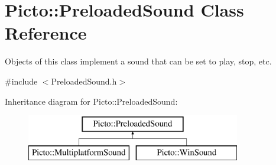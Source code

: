 \hypertarget{class_picto_1_1_preloaded_sound}{\section{Picto\-:\-:Preloaded\-Sound Class Reference}
\label{class_picto_1_1_preloaded_sound}
}


Objects of this class implement a sound that can be set to play, stop, etc.  




{\ttfamily \#include $<$Preloaded\-Sound.\-h$>$}

Inheritance diagram for Picto\-:\-:Preloaded\-Sound\-:\begin{figure}[H]
\begin{center}
\leavevmode
\includegraphics[height=2.000000cm]{class_picto_1_1_preloaded_sound}
\end{center}
\end{figure}
